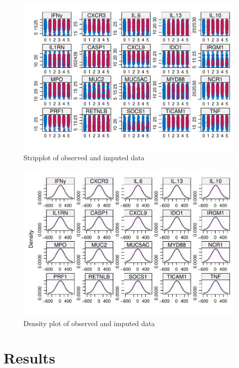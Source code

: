 \documentclass[webpdf,large,contemporary,namedate]{oup-authoring-template}
\theoremstyle{thmstyleone}
\theoremstyle{thmstyletwo}
\theoremstyle{thmstylethree}
\begin{document}
\begin{figure}[th]
\includegraphics[width=1\linewidth]{Article_hybrids_tolerance_files/figure-latex/fig1-1} \caption{Stripplot of observed and imputed data}\label{fig:fig1}
\end{figure}

\begin{figure}[th]
\includegraphics[width=1\linewidth]{Article_hybrids_tolerance_files/figure-latex/fig2-1} \caption{Density plot of observed and imputed data}\label{fig:fig2}
\end{figure}

\hypertarget{results}{%
\section{Results}\label{results}}
\end{document}
